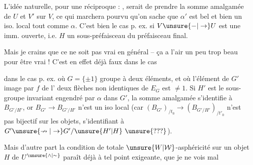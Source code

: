 
L'idée naturelle, pour une réciproque : , serait de prendre  la somme amalgamée de $U$ et $V'$ sur $V$, ce qui  marchera pourvu qu'on sache que $\alpha'$ est bel et bien un iso. local tout comme $\alpha$. C'est bien le cas p. ex. si $V\unsure{-|\to}U$ est une imm. ouverte, i.e. $H$ un sous-préfaisceau du préfaisceau final.

Mais je crains que ce ne soit pas vrai en général -- ça a l'air un peu trop beau pour être vrai ! C'est en effet déjà faux dans le cas


dans le cas p. ex. où $G=\{\pm1\}$ groupe à deux éléments, et où l'élément \inserted{$\alpha$} de $G'$ image par $f$ de l' deux flèches non identiques de $E_G$ est $\ne1$. Si $H'$ est le sous-groupe invariant engendré par $\alpha$ dans $G'$, la  somme amalgamée s'identifie à $B_{G'/H'}$, or $B_{G'}\to B_{G'/H'}$ n'est  un iso local (car $(B_{G'})_{/t_0}\to(B_{G'/H'})_{/t'_0}$ n'est pas bijectif sur les objets, s'identifiant à $G'\unsure{\nrightarrow|\to}G'/\unsure{H'|H}\ \unsure{???}$).

Mais d'autre part la condition de totale $\unsure{W|\mathcal W}$-asphéricité sur un objet $H$ de $U^{\unsure{\wedge|\sim}}$ paraît déjà à tel point exigeante, que je ne vois mal 
